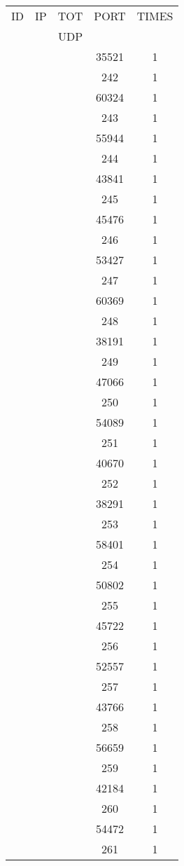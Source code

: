 \documentclass[a4paper]{scrartcl}
\begin{document}
\begin{minipage}[b]{0.5\linewidth}
\begin{tabular}{| c | c | c | c | c |}
\hline
ID & IP & TOT & PORT & TIMES \\ 
   &    & UDP &      &       \\ 
\hline
& & & 35521 & 1 \\ & & & 242 & 1 \\ & & & 60324 & 1 \\ & & & 243 & 1 \\ & & & 55944 & 1 \\ & & & 244 & 1 \\ & & & 43841 & 1 \\ & & & 245 & 1 \\ & & & 45476 & 1 \\ & & & 246 & 1 \\ & & & 53427 & 1 \\ & & & 247 & 1 \\ & & & 60369 & 1 \\ & & & 248 & 1 \\ & & & 38191 & 1 \\ & & & 249 & 1 \\ & & & 47066 & 1 \\ & & & 250 & 1 \\ & & & 54089 & 1 \\ & & & 251 & 1 \\ & & & 40670 & 1 \\ & & & 252 & 1 \\ & & & 38291 & 1 \\ & & & 253 & 1 \\ & & & 58401 & 1 \\ & & & 254 & 1 \\ & & & 50802 & 1 \\ & & & 255 & 1 \\ & & & 45722 & 1 \\ & & & 256 & 1 \\ & & & 52557 & 1 \\ & & & 257 & 1 \\ & & & 43766 & 1 \\ & & & 258 & 1 \\ & & & 56659 & 1 \\ & & & 259 & 1 \\ & & & 42184 & 1 \\ & & & 260 & 1 \\ & & & 54472 & 1 \\ & & & 261 & 1 \\ \hline\end{tabular}\end{minipage} \hfill\begin{minipage}[b]{0.5\linewidth}\begin{tabular}{| c | c | c | c | c |}

\end{tabular}
\end{minipage}
\end{document}
